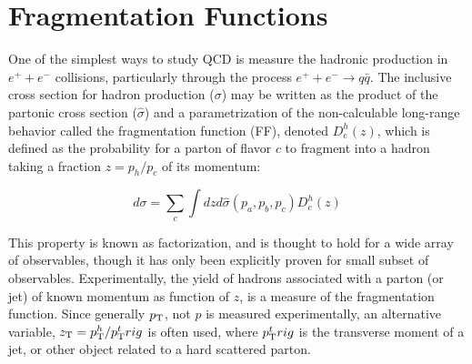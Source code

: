 
\section{Fragmentation Functions}
\label{sec:FF}
One of the simplest ways to study QCD is measure the hadronic production in $e^+ + e^-$ collisions, particularly through the process  $e^+ + e^- \rightarrow q\bar{q}$. The inclusive cross section for hadron production ($\sigma$) may be written as the product of the partonic cross section ($\hat{\sigma}$) and a parametrization of the non-calculable long-range behavior called the fragmentation function (FF), denoted $D_c^h(z)$, which is defined as the probability for a parton of flavor $c$ to fragment into a hadron taking a fraction $z=p_h/p_c$ of its momentum:

  \begin{equation}
    d\sigma = \sum_c\int dz d\hat{\sigma}(p_a,p_b,p_c)D_c^h(z)
    \label{eq:hadron_cross_section}
  \end{equation}

This property is known as factorization, and is thought to hold for a wide array of observables, though it has only been explicitly proven for small subset of observables. Experimentally, the yield of hadrons associated with a parton (or jet) of known momentum as function of $z$, is a measure of the fragmentation function. Since generally $p_{\mathrm{T}}$, not  $p$ is measured experimentally, an alternative variable,  $z_{\mathrm{T}}=p_{\mathrm{T}}^h/p_{\mathrm{T}}^trig$ is often used, where $p_{\mathrm{T}}^trig$ is the transverse moment of a jet, or other object related to a hard scattered parton. 

